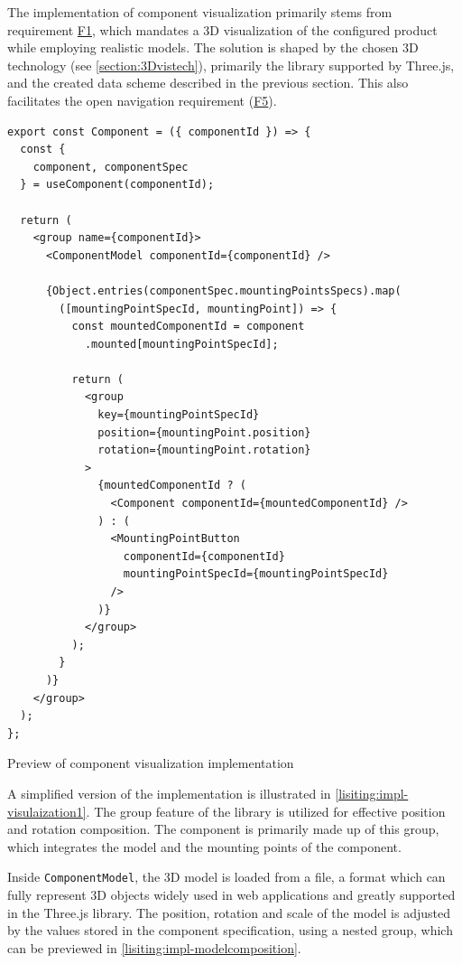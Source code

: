 The implementation of component visualization primarily stems from requirement \hyperref[itm:F1]{F1}, which mandates a 3D visualization of the configured product while employing realistic models. The solution is shaped by the chosen 3D technology (see \autoref{section:3Dvistech}), primarily the  library supported by Three.js, and the created data scheme described in the previous section. This also facilitates the open navigation requirement (\hyperref[itm:F5]{F5}).

\begin{listing}[h!]
\begin{verbatim}
export const Component = ({ componentId }) => {
  const { 
    component, componentSpec
  } = useComponent(componentId);

  return (
    <group name={componentId}>
      <ComponentModel componentId={componentId} />

      {Object.entries(componentSpec.mountingPointsSpecs).map(
        ([mountingPointSpecId, mountingPoint]) => {
          const mountedComponentId = component
            .mounted[mountingPointSpecId];

          return (
            <group
              key={mountingPointSpecId}
              position={mountingPoint.position}
              rotation={mountingPoint.rotation}
            >
              {mountedComponentId ? (
                <Component componentId={mountedComponentId} />
              ) : (
                <MountingPointButton
                  componentId={componentId}
                  mountingPointSpecId={mountingPointSpecId}
                />
              )}
            </group>
          );
        }
      )}
    </group>
  );
};
\end{verbatim}
\caption{Preview of component visualization implementation}
\label{lisiting:impl-visulaization1}
\end{listing}

A simplified version of the implementation is illustrated in \autoref{lisiting:impl-visulaization1}. The group feature of the  library is utilized for effective position and rotation composition. The component is primarily made up of this group, which integrates the model and the mounting points of the component.

Inside \texttt{ComponentModel}, the 3D model is loaded from a  file, a format which can fully represent 3D objects widely used in web applications and greatly supported in the Three.js library. The position, rotation and scale of the model is adjusted by the values stored in the component specification, using a nested  group, which can be previewed in \autoref{lisiting:impl-modelcomposition}.

